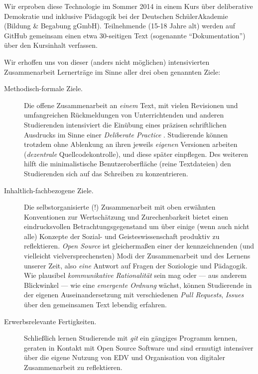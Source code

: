 \documentclass[11pt,a4paper,oneside]{article}
\begin{document}
Wir erproben diese Technologie im Sommer 2014 in einem Kurs über deliberative Demokratie und inklusive Pädagogik bei der Deutschen SchülerAkademie (Bildung & Begabung gGmbH).
Teilnehmende (15-18 Jahre alt) werden auf GitHub gemeinsam einen etwa 30-seitigen Text (sogenannte ``Dokumentation'') über den Kursinhalt verfassen.

Wir erhoffen uns von dieser (anders nicht möglichen) intensivierten Zusammenarbeit Lernerträge im Sinne aller drei oben genannten Ziele:
\begin{description}
	\item[Methodisch-formale Ziele.]
		Die offene Zusammenarbeit an \emph{einem} Text, mit vielen Revisionen und umfangreichen Rückmeldungen von Unterrichtenden und anderen Studierenden intensiviert die Einübung eines präzisen schriftlichen Ausdrucks im Sinne einer \emph{Deliberate Practice} \cite{Ericsson2007}.
		Studierende können trotzdem ohne Ablenkung an ihren jeweils \emph{eigenen} Versionen arbeiten (\emph{dezentrale} Quellcodekontrolle), und diese später einpflegen.
		Des weiteren hilft die minimalistische Benutzeroberfläche (reine Textdateien) den Studierenden sich auf das Schreiben zu konzentrieren.
	\item[Inhaltlich-fachbezogene Ziele.]
		Die selbstorganisierte (!) Zusammenarbeit mit oben erwähnten Konventionen zur Wertschätzung und Zurechenbarkeit bietet einen eindrucksvollen Betrachtungsgegenstand um über einige (wenn auch nicht alle) Konzepte der Sozial- und Geisteswissenschaft produktiv zu reflektieren.
		\emph{Open Source} ist gleichermaßen einer der kennzeichnenden (und vielleicht vielversprechensten) Modi der Zusammenarbeit und des Lernens unserer Zeit, also \emph{eine} Antwort auf Fragen der Soziologie und Pädagogik.
		Wie plausibel \emph{kommunikative Rationalität} \cite{Habermas-1984} sein mag oder --- aus anderem Blickwinkel --- wie eine \emph{emergente Ordnung} \cite{hamowy_constitution_2011} wächst, können Studierende in der eigenen Auseinandersetzung mit verschiedenen \emph{Pull Requests}, \emph{Issues} über den gemeinsamen Text lebendig erfahren.
	\item[Erwerbsrelevante Fertigkeiten.]
		Schließlich lernen  Studierende mit \emph{git} ein gängiges Programm kennen, geraten in Kontakt mit Open Source Software und sind ermutigt intensiver über die eigene Nutzung von EDV und Organisation von digitaler Zusammenarbeit zu reflektieren.
\end{description}
\end{document}
